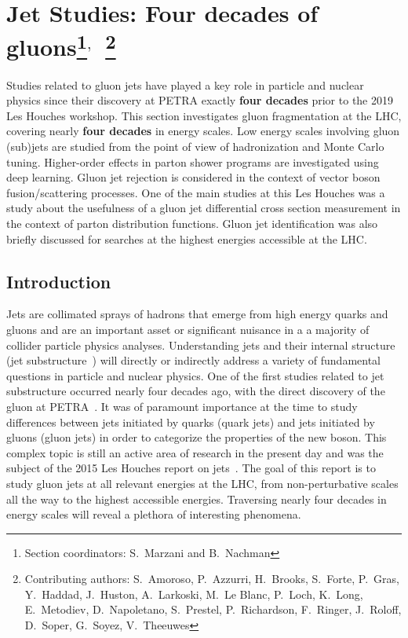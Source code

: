 \documentclass[11pt]{cernrep}
\begin{document}
\section{Jet Studies: Four decades of gluons\protect\footnote{Section coordinators: S.~Marzani and B.~Nachman}$^{,}$~\protect\footnote{Contributing authors: S.~Amoroso, P.~Azzurri, H.~Brooks, S.~Forte, P.~Gras, Y.~Haddad, J.~Huston, A.~Larkoski, M.~Le Blanc, P.~Loch, K.~Long, E.~Metodiev, D.~Napoletano, S.~Prestel, P.~Richardson, F.~Ringer, J.~Roloff, D.~Soper, G.~Soyez, V.~Theeuwes}}

Studies related to gluon jets have played a key role in particle and nuclear physics since their discovery at PETRA exactly \textbf{four decades} prior to the 2019 Les Houches workshop.  This section investigates gluon fragmentation at the LHC, covering nearly \textbf{four decades} in energy scales.  Low energy scales involving gluon (sub)jets are studied from the point of view of hadronization and Monte Carlo tuning.  Higher-order effects in parton shower programs are investigated using deep learning.  Gluon jet rejection is considered in the context of vector boson fusion/scattering processes.  One of the main studies at this Les Houches was a study about the usefulness of a gluon jet differential cross section measurement in the context of parton distribution functions.  Gluon jet identification was also briefly discussed for searches at the highest energies accessible at the LHC.

\subsection{Introduction}
\label{sec:jets:intro}

Jets are collimated sprays of hadrons that emerge from high energy quarks and gluons and are an important asset or significant nuisance in a a majority of collider particle physics analyses.  Understanding jets and their internal structure (jet substructure~\cite{Abdesselam:2010pt,Altheimer:2012mn,Altheimer:2013yza,Adams:2015hiv,Asquith:2018igt,Larkoski:2017jix}) will directly or indirectly address a variety of fundamental questions in particle and nuclear physics.  One of the first studies related to jet substructure occurred nearly four decades ago, with the direct discovery of the gluon at PETRA~\cite{Brandelik:1979bd,Barber:1979yr,Berger:1979cj,Bartel:1979ut,Ellis:2014rma}.  It was of paramount importance at the time to study differences between jets initiated by quarks (quark jets) and jets initiated by gluons (gluon jets) in order to categorize the properties of the new boson.  This complex topic is still an active area of research in the present day and was the subject of the 2015 Les Houches report on jets~\cite{Badger:2016bpw,Gras:2017jty}.   The goal of this report is to study gluon jets at all relevant energies at the LHC, from non-perturbative scales all the way to the highest accessible energies.   Traversing nearly four decades in energy scales will reveal a plethora of interesting phenomena.  
\end{document}
